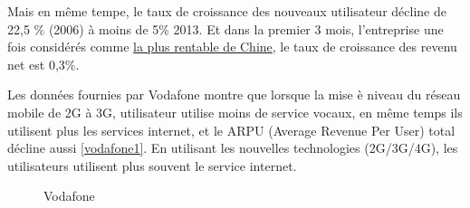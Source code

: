Mais en même tempe, le taux de croissance des nouveaux utilisateur décline de 22,5 \% (2006) à moins de 5\% 2013. Et dans la premier 3 mois, l'entreprise une fois considérés comme \href{http://www.marketing-chine.com/entreprises-chinoises/le-top-50-des-marques-chinoises}{la plus rentable de Chine}, le taux de croissance des revenu net est 0,3\%.

Les données fournies par Vodafone montre que lorsque la mise è niveau du réseau mobile de 2G à 3G, utilisateur utilise moins de service vocaux, en même temps ils utilisent plus les services internet, et le ARPU (Average Revenue Per User) total décline aussi \ref{vodafone1}. En utilisant les nouvelles technologies (2G/3G/4G), les utilisateurs utilisent plus souvent le service internet.
 \begin{figure}[H]
 	\flushleft
 	\hfill
 	\hspace{1in}
 	\caption{Vodafone} 
 \end{figure}
   
 
  
  
  
